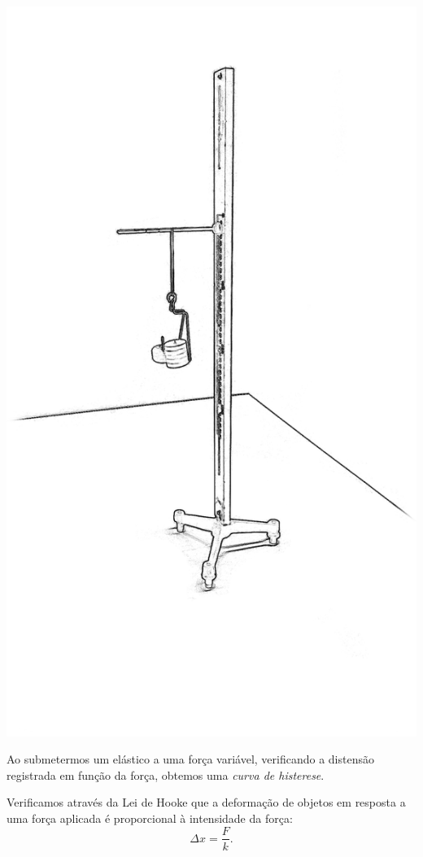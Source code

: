 \begin{marginfigure}[7cm]
	\includegraphics[width=\textwidth]{Ilustrations/Elasticidade.png}
	\caption{Ao submetermos um elástico a uma força variável, verificando a distensão registrada em função da força, obtemos uma \emph{curva de histerese}.}
\end{marginfigure}

Verificamos através da Lei de Hooke que a deformação de objetos em resposta a uma força aplicada é proporcional à intensidade da força:
\begin{equation}
	\Delta x = \frac{F}{k}.
\end{equation}

